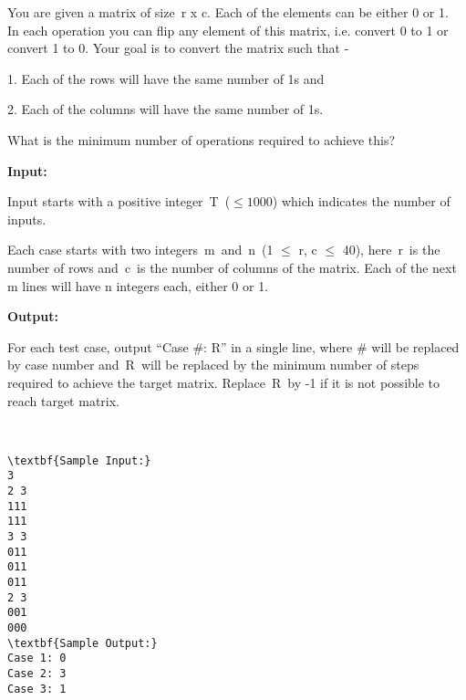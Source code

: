 

You are given a matrix of size r x c. Each of the elements can be either 0 or 1.  In each operation you can flip any element of this matrix, i.e. convert 0 to 1 or convert 1 to 0. Your goal is to convert the matrix such that -

1. Each of the rows will have the same number of 1s and

2. Each of the columns will have the same number of 1s.

What is the minimum number of operations required to achieve this?

\textbf{Input:}

Input starts with a positive integer T ($ \le 1000$) which indicates the number of inputs.

Each case starts with two integers m and n (1  $\le$  r, c  $\le$  40), here r is the number of rows and c is the number of columns of the matrix. Each of the next m lines will have n integers each, either 0 or 1.

\textbf{Output:}

For each test case, output “Case \#: R” in a single line, where \# will be replaced by case number and R will be replaced by the minimum number of steps required to achieve the target matrix. Replace R by -1 if it is not possible to reach target matrix.

 
\begin{verbatim}
\textbf{Sample Input:}
3
2 3
111
111
3 3
011
011
011
2 3
001
000
\textbf{Sample Output:}
Case 1: 0
Case 2: 3
Case 3: 1
\end{verbatim}
